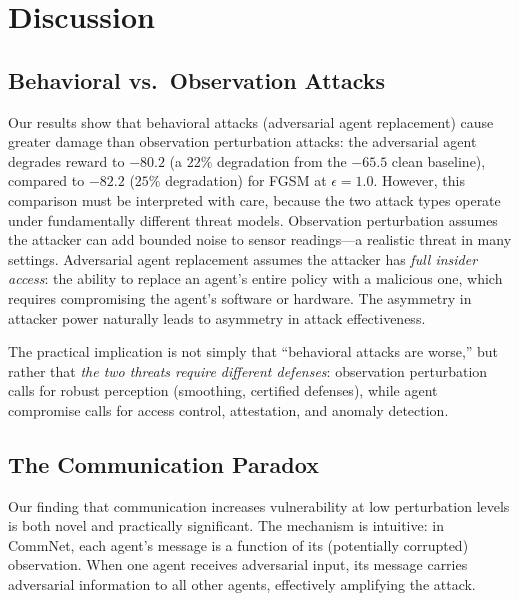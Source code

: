 \documentclass[12pt,a4paper]{article}
\begin{document}
\section{Discussion}
\label{sec:discussion}

\subsection{Behavioral vs.\ Observation Attacks}

Our results show that behavioral attacks (adversarial agent replacement) cause greater damage than observation perturbation attacks: the adversarial agent degrades reward to $-80.2$ (a $22\%$ degradation from the $-65.5$ clean baseline), compared to $-82.2$ ($25\%$ degradation) for FGSM at $\epsilon = 1.0$. However, this comparison must be interpreted with care, because the two attack types operate under fundamentally different threat models. Observation perturbation assumes the attacker can add bounded noise to sensor readings---a realistic threat in many settings. Adversarial agent replacement assumes the attacker has \emph{full insider access}: the ability to replace an agent's entire policy with a malicious one, which requires compromising the agent's software or hardware. The asymmetry in attacker power naturally leads to asymmetry in attack effectiveness.

The practical implication is not simply that ``behavioral attacks are worse,'' but rather that \emph{the two threats require different defenses}: observation perturbation calls for robust perception (smoothing, certified defenses), while agent compromise calls for access control, attestation, and anomaly detection.

\subsection{The Communication Paradox}

Our finding that communication increases vulnerability at low perturbation levels is both novel and practically significant. The mechanism is intuitive: in CommNet, each agent's message is a function of its (potentially corrupted) observation. When one agent receives adversarial input, its message carries adversarial information to all other agents, effectively amplifying the attack.
\end{document}
